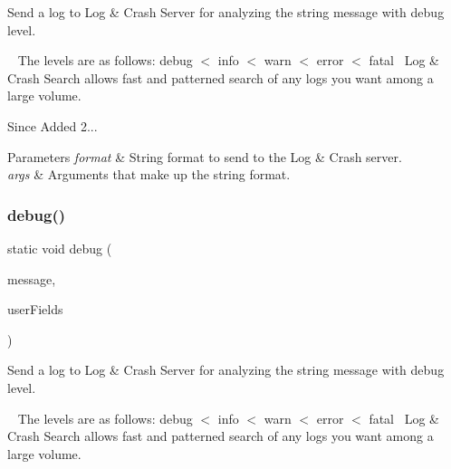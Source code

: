 Send a log to Log \& Crash Server for analyzing the string message with debug level. 

~\newline
 The levels are as follows\+: debug $<$ info $<$ warn $<$ error $<$ fatal~\newline
 Log \& Crash Search allows fast and patterned search of any logs you want among a large volume.

\begin{DoxySince}{Since}
Added 2... 
\end{DoxySince}

\begin{DoxyParams}{Parameters}
{\em format} & String format to send to the Log \& Crash server. \\
\hline
{\em args} & Arguments that make up the string format. \\
\hline
\end{DoxyParams}
\mbox{\label{classcom_1_1toast_1_1android_1_1gamebase_1_1_gamebase_1_1_logger_ae82c0cfc5bedaf421e35af61064f520e}} 
\subsubsection{\texorpdfstring{debug()}{debug()}\hspace{0.1cm}{\footnotesize\ttfamily [3/3]}}
{\footnotesize\ttfamily static void debug (\begin{DoxyParamCaption}\item[{@Non\+Null final String}]{message,  }\item[{@Non\+Null final Map$<$ String, String $>$}]{user\+Fields }\end{DoxyParamCaption})\hspace{0.3cm}{\ttfamily [static]}}



Send a log to Log \& Crash Server for analyzing the string message with debug level. 

~\newline
 The levels are as follows\+: debug $<$ info $<$ warn $<$ error $<$ fatal~\newline
 Log \& Crash Search allows fast and patterned search of any logs you want among a large volume.

